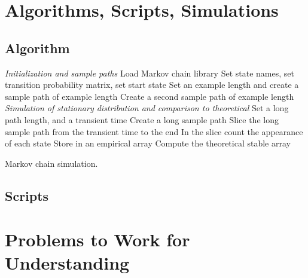 \documentclass[12pt]{article}
\begin{document}
\hr

\section*{Algorithms, Scripts, Simulations}

\subsection*{Algorithm}

\begin{algorithm}[H]
    \DontPrintSemicolon
    \BlankLine
    \emph{Initialization and sample paths}\;
    Load Markov chain library\;
    Set state names, set transition probability matrix, set start
    state\;
    Set an example length and create a sample path of example length\;
    Create a second sample path of example length\;
    \BlankLine
    \emph{Simulation of stationary distribution and comparison to theoretical}\;
    Set a long path length, and a transient time\;
    Create a long sample path\;
    Slice the long sample path from the transient time to the end\;
    In the slice count the appearance of each state\;
    Store in an empirical array\;
    Compute the theoretical stable array\;

    \caption{Markov chain simulation.}
\end{algorithm}
\subsection*{Scripts}



\hr

\section*{Problems to Work for Understanding}

\renewcommand{\theexerciseseries}{}
\renewcommand{\theexercise}{\arabic{exercise}}
\end{document}
